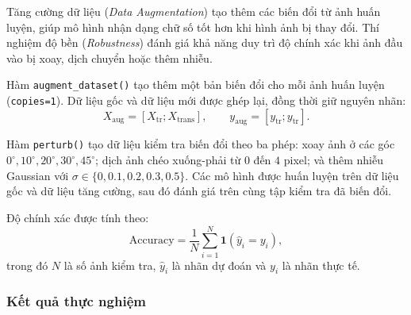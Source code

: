 Tăng cường dữ liệu (\textit{Data Augmentation}) tạo thêm các biến đổi từ ảnh huấn luyện, giúp mô hình nhận dạng chữ số tốt
hơn khi hình ảnh bị thay đổi. Thí nghiệm độ bền (\textit{Robustness})
đánh giá khả năng duy trì độ chính xác khi ảnh đầu vào bị xoay,
dịch chuyển hoặc thêm nhiễu.

Hàm \texttt{augment\_dataset()} tạo thêm một bản biến đổi cho mỗi
ảnh huấn luyện (\texttt{copies=1}). Dữ liệu gốc và dữ liệu mới được
ghép lại, đồng thời giữ nguyên nhãn:
\[
X_{\mathrm{aug}}=[X_{\mathrm{tr}};X_{\mathrm{trans}}],
\qquad
y_{\mathrm{aug}}=[y_{\mathrm{tr}};y_{\mathrm{tr}}].
\]

Hàm \texttt{perturb()} tạo dữ liệu kiểm tra biến đổi theo ba phép:
xoay ảnh ở các góc $0^\circ,10^\circ,20^\circ,30^\circ,45^\circ$;
dịch ảnh chéo xuống-phải từ $0$ đến $4$ pixel; và thêm nhiễu
Gaussian với $\sigma\in\{0,0.1,0.2,0.3,0.5\}$.
Các mô hình được huấn luyện trên dữ liệu gốc và dữ liệu tăng cường,
sau đó đánh giá trên cùng tập kiểm tra đã biến đổi.

Độ chính xác được tính theo:
\[
\mathrm{Accuracy}=
\frac{1}{N}\sum_{i=1}^{N}
\mathbf{1}(\hat{y}_i=y_i),
\]
trong đó $N$ là số ảnh kiểm tra, $\hat{y}_i$ là nhãn dự đoán và
$y_i$ là nhãn thực tế.

\subsubsection{Kết quả thực nghiệm}

